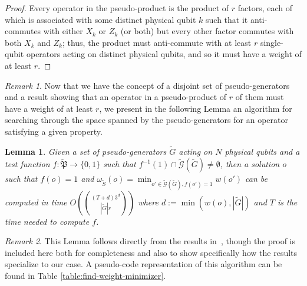 \documentclass[12pt]{amsbook}
\theoremstyle{plain}
\newtheorem{lemma}{Lemma}
\theoremstyle{definition}
\theoremstyle{remark}
\newtheorem{remark}{Remark}
\newcommand{\set}{\tilde}
\newcommand{\genfun}{\tilde{\mathcal{G}}}
\newcommand{\pauligroup}{{\set{\mathfrak{P}}}}
\newcommand{\om}{\omega}
\newcommand{\paren}[1]{\left(#1\right)}
\begin{document}
\begin{proof}
Every operator in the pseudo-product is the product of $r$ factors, each of which is associated with some distinct physical qubit $k$ such that it anti-commutes with either $X_k$ or $Z_k$ (or both) but every other factor commutes with both $X_k$ and $Z_k$;  thus, the product must anti-commute with at least $r$ single-qubit operators acting on distinct physical qubits, and so it must have a weight of at least $r$.
\end{proof}
\begin{remark}
Now that we have the concept of a disjoint set of pseudo-generators and a result showing that an operator in a pseudo-product of $r$ of them must have a weight of at least $r$, we present in the following Lemma an algorithm for searching through the space spanned by the pseudo-generators for an operator satisfying a given property.
\end{remark}

\begin{lemma}
\label{lemma:minimal-weight-search}
Given a set of pseudo-generators $\set G$ acting on $N$ physical qubits and a test function $f:\pauligroup\to\{0,1\}$ such that $f^{-1}(1)\cap\genfun(\set G)\ne\emptyset$, then a solution $o$ such that $f(o)=1$ and $\om_{\set S}(o)=\min_{o'\in \genfun(\set G), f(o')=1} w(o')$ can be computed in time $O\paren{(T+d)3^d\choose{|\set G|}{r}}$ where $d:=\min\paren{w(o),|\set G|}$ and $T$ is the time needed to compute $f$.
\end{lemma}

\begin{remark}
This Lemma follows directly from the results in~\cite{White:2006fj}, though the proof is included here both for completeness and also to show specifically how the results specialize to our case.  A pseudo-code representation of this algorithm can be found in Table \ref{table:find-weight-minimizer}.
\end{remark}
\end{document}
